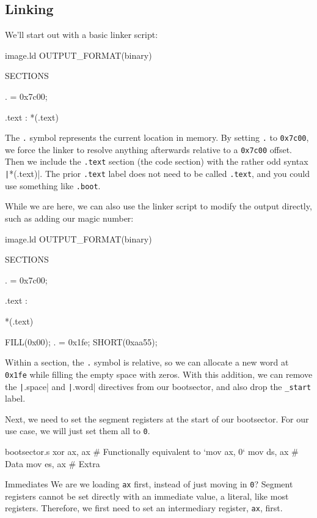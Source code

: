 \documentclass{article}
\begin{document}
\subsection{Linking}

We'll start out with a basic linker script:

\begin{ld}{image.ld}
	OUTPUT_FORMAT(binary)
	
	SECTIONS {
		. = 0x7c00;
		
		.text : {
			*(.text)
		}
	}
\end{ld}

The \Verb|.| symbol represents the current location in memory. By setting \Verb|.| to \Verb|0x7c00|, we force
the linker to resolve anything afterwards relative to a \Verb|0x7c00| offset. Then we include the \Verb|.text|
section (the code section) with the rather odd syntax \texttt|*(.text)|. The prior \Verb|.text| label
does not need to be called \Verb|.text|, and you could use something like \Verb|.boot|.

While we are here, we can also use the linker script to modify the output directly, such as adding our magic
number:

\begin{ld}{image.ld}
	OUTPUT_FORMAT(binary)
	
	SECTIONS {
		. = 0x7c00;
		
		.text : {
			*(.text)
			
			FILL(0x00);
			. = 0x1fe;
			SHORT(0xaa55);
		}
	}
\end{ld}

Within a section, the \Verb|.| symbol is relative, so we can allocate a new word at \Verb|0x1fe| while filling
the empty space with zeros. With this addition, we can remove the \texttt|.space| and
\texttt|.word| directives from our bootsector, and also drop the \Verb|_start| label.

Next, we need to set the segment registers at the start of our bootsector. For our use case, we will just set
them all to \Verb|0|.

\begin{gas}{bootsector.s}
	xor ax, ax # Functionally equivalent to `mov ax, 0`
	mov ds, ax # Data
	mov es, ax # Extra
\end{gas}

\begin{info}{Immediates}
	We are we loading \Verb|ax| first, instead of just moving in \Verb|0|? Segment registers cannot be set
	directly with an immediate value, a literal, like most registers. Therefore, we first need to set an
	intermediary register, \Verb|ax|, first.
\end{info}
\end{document}
